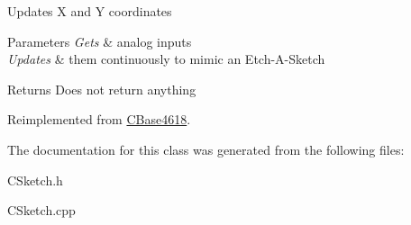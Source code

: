 Updates X and Y coordinates


\begin{DoxyParams}{Parameters}
{\em Gets} & analog inputs \\
\hline
{\em Updates} & them continuously to mimic an Etch-\/\+A-\/\+Sketch\\
\hline
\end{DoxyParams}
\begin{DoxyReturn}{Returns}
Does not return anything 
\end{DoxyReturn}


Reimplemented from \hyperlink{class_c_base4618_a46e2ad109d3c7c877d00cff9093736c7}{C\+Base4618}.



The documentation for this class was generated from the following files\+:\begin{DoxyCompactItemize}
\item 
C\+Sketch.\+h\item 
C\+Sketch.\+cpp\end{DoxyCompactItemize}

